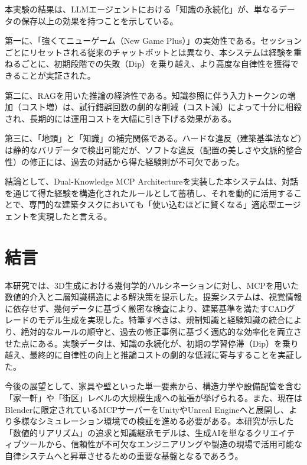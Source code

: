 \documentclass[dvipdfmx, a4paper, 9pt]{deimj}
\begin{document}
本実験の結果は、LLMエージェントにおける「知識の永続化」が、単なるデータの保存以上の効果を持つことを示している。

第一に、「強くてニューゲーム（New Game Plus）」の実効性である。セッションごとにリセットされる従来のチャットボットとは異なり、本システムは経験を重ねるごとに、初期段階での失敗（Dip）を乗り越え、より高度な自律性を獲得できることが実証された。

第二に、RAGを用いた推論の経済性である。知識参照に伴う入力トークンの増加（コスト増）は、試行錯誤回数の劇的な削減（コスト減）によって十分に相殺され、長期的には運用コストを大幅に引き下げる効果がある。

第三に、「地頭」と「知識」の補完関係である。ハードな違反（建築基準法など）は静的なバリデータで検出可能だが、ソフトな違反（配置の美しさや文脈的整合性）の修正には、過去の対話から得た経験則が不可欠であった。

結論として、Dual-Knowledge MCP Architectureを実装した本システムは、対話を通じて得た経験を構造化されたルールとして蓄積し、それを動的に活用することで、専門的な建築タスクにおいても「使い込むほどに賢くなる」適応型エージェントを実現したと言える。

\section{結言}

本研究では、3D生成における幾何学的ハルシネーションに対し、MCPを用いた数値的介入と二層知識構造による解決策を提示した。提案システムは、視覚情報に依存せず、幾何データに基づく厳密な検査により、建築基準を満たすCADグレードのモデル生成を実現した。特筆すべきは、規制知識と経験知識の統合により、絶対的なルールの順守と、過去の修正事例に基づく適応的な効率化を両立させた点にある。実験データは、知識の永続化が、初期の学習停滞（Dip）を乗り越え、最終的に自律性の向上と推論コストの劇的な低減に寄与することを実証した。

今後の展望として、家具や壁といった単一要素から、構造力学や設備配管を含む「家一軒」や「街区」レベルの大規模生成への拡張が挙げられる。また、現在はBlenderに限定されているMCPサーバーをUnityやUnreal Engineへと展開し、より多様なシミュレーション環境での検証を進める必要がある。本研究が示した「数値的リアリズム」の追求と知識継承モデルは、生成AIを単なるクリエイティブツールから、信頼性が不可欠なエンジニアリングや製造の現場で活用可能な自律システムへと昇華させるための重要な基盤となるであろう。




\end{document}
